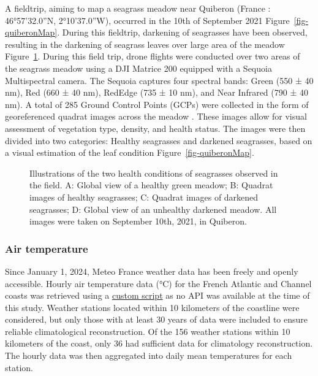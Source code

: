 \documentclass[
  number]{elsarticle}
\begin{document}
A fieldtrip, aiming to map a seagrass meadow near Quiberon (France :
46°57'32.0''N, 2°10'37.0''W), occurred in the 10th of September 2021
Figure~\ref{fig-quiberonMap}. During this fieldtrip, darkening of
seagrasses have been observed, resulting in the darkening of seagrass
leaves over large area of the meadow Figure~\ref{fig-QuiberonImg}.
During this field trip, drone flights were conducted over two areas of
the seagrass meadow using a DJI Matrice 200 equipped with a Sequoia
Multispectral camera. The Sequoia captures four spectral bands: Green
(550 ± 40 nm), Red (660 ± 40 nm), RedEdge (735 ± 10 nm), and Near
Infrared (790 ± 40 nm). A total of 285 Ground Control Points (GCPs) were
collected in the form of georeferenced quadrat images across the meadow
. These images allow for visual assessment of vegetation type, density,
and health status. The images were then divided into two categories:
Healthy seagrasses and darkened seagrasses, based on a visual estimation
of the leaf condition Figure~\ref{fig-quiberonMap}.

\label{cell-fig-QuiberonImg}
\begin{figure}[H]


\caption{\label{fig-QuiberonImg}Illustrations of the two health
conditions of seagrasses observed in the field. A: Global view of a
healthy green meadow; B: Quadrat images of healthy seagrasses; C:
Quadrat images of darkened seagrasses; D: Global view of an unhealthy
darkened meadow. All images were taken on September 10th, 2021, in
Quiberon.}

\end{figure}%

\subsubsection{Air temperature}\label{air-temperature}

Since January 1, 2024, Meteo France weather data has been freely and
openly accessible. Hourly air temperature data (°C) for the French
Atlantic and Channel coasts was retrieved using a
\href{https://github.com/SigOiry/HeatWave_Seagrasses/blob/main/Scripts/MeteoFrance_Extraction.qmd}{custom
script} as no API was available at the time of this study. Weather
stations located within 10 kilometers of the coastline were considered,
but only those with at least 30 years of data were included to ensure
reliable climatological reconstruction. Of the 156 weather stations
within 10 kilometers of the coast, only 36 had sufficient data for
climatology reconstruction. The hourly data was then aggregated into
daily mean temperatures for each station.
\end{document}
